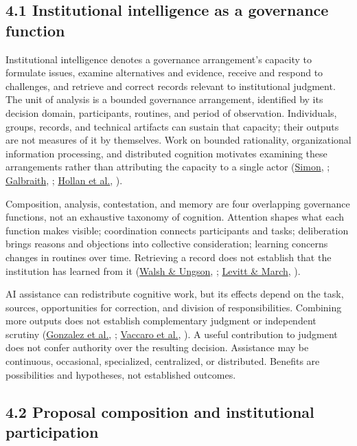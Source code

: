 \documentclass[
  10pt,
]{article}
\newcommand{\axCite}[2]{\hyperlink{cite.#1}{#2}, \citeyear{#1}}
\begin{document}
\subsection{4.1 Institutional intelligence as a governance
function}\label{institutional-intelligence-as-a-governance-function}

Institutional intelligence denotes a governance arrangement's capacity
to formulate issues, examine alternatives and evidence, receive and
respond to challenges, and retrieve and correct records relevant to
institutional judgment. The unit of analysis is a bounded governance
arrangement, identified by its decision domain, participants, routines,
and period of observation. Individuals, groups, records, and technical
artifacts can sustain that capacity; their outputs are not measures of
it by themselves. Work on bounded rationality, organizational
information processing, and distributed cognition motivates examining
these arrangements rather than attributing the capacity to a single
actor (\axCite{simon1978rational}{Simon}; \axCite{galbraith1974organization}{Galbraith}; \axCite{hollan2000distributed}{Hollan et al.}).

Composition, analysis, contestation, and memory are four overlapping
governance functions, not an exhaustive taxonomy of cognition. Attention
shapes what each function makes visible; coordination connects
participants and tasks; deliberation brings reasons and objections into
collective consideration; learning concerns changes in routines over
time. Retrieving a record does not establish that the institution has
learned from it (\axCite{walsh1991memory}{Walsh \& Ungson}; \axCite{levitt1988learning}{Levitt \& March}).

AI assistance can redistribute cognitive work, but its effects depend on
the task, sources, opportunities for correction, and division of
responsibilities. Combining more outputs does not establish
complementary judgment or independent scrutiny (\axCite{gonzalez2026teaming}{Gonzalez et al.}; \axCite{vaccaro2024combinations}{Vaccaro et al.}). A useful contribution to judgment does not confer
authority over the resulting decision. Assistance may be continuous,
occasional, specialized, centralized, or distributed. Benefits are
possibilities and hypotheses, not established outcomes.

\subsection{4.2 Proposal composition and institutional
participation}\label{proposal-composition-and-institutional-participation}
\end{document}
